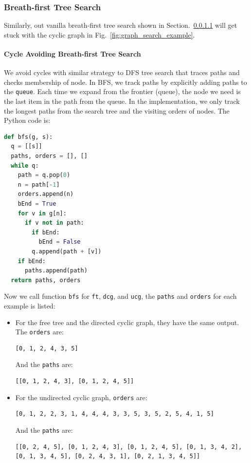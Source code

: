 \documentclass[../main.tex]{subfiles}
\begin{document}
\subsubsection{Breath-first Tree Search}
Similarly, out vanilla breath-first tree search shown in Section.~\ref{} will get stuck with the cyclic graph in Fig.~\ref{fig:graph_search_example}. 
\paragraph{Cycle Avoiding Breath-first Tree Search} We avoid cycles with similar strategy to DFS tree search that traces paths and checks membership of node. In BFS, we track paths by explicitly adding paths to the \texttt{queue}. Each time we expand from the frontier (queue), the node we need is the last item in the path from the queue. In the implementation, we only track the longest paths from the search tree and the visiting orders of nodes. The Python code is:
\begin{lstlisting}[language=Python]
def bfs(g, s):
  q = [[s]]
  paths, orders = [], []
  while q:
    path = q.pop(0)
    n = path[-1]
    orders.append(n)
    bEnd = True
    for v in g[n]:
      if v not in path:
        if bEnd:
          bEnd = False
        q.append(path + [v])
    if bEnd:
      paths.append(path)
  return paths, orders
\end{lstlisting}
Now we call function \texttt{bfs} for \texttt{ft}, \texttt{dcg}, and \texttt{ucg}, the \texttt{paths} and \texttt{orders} for each example is listed:
\begin{itemize}
    \item For the free tree and the directed cyclic graph, they have the same output. The \texttt{orders} are:
\begin{lstlisting}[numbers=none]
[0, 1, 2, 4, 3, 5]
\end{lstlisting}
    And the \texttt{paths} are:
\begin{lstlisting}[numbers=none]
[[0, 1, 2, 4, 3], [0, 1, 2, 4, 5]]
\end{lstlisting}
    \item For the undirected cyclic graph, \texttt{orders} are:
\begin{lstlisting}[numbers=none]
[0, 1, 2, 2, 3, 1, 4, 4, 4, 3, 3, 5, 3, 5, 2, 5, 4, 1, 5]
\end{lstlisting}
    And the \texttt{paths} are:
\begin{lstlisting}[numbers=none]
[[0, 2, 4, 5], [0, 1, 2, 4, 3], [0, 1, 2, 4, 5], [0, 1, 3, 4, 2], [0, 1, 3, 4, 5], [0, 2, 4, 3, 1], [0, 2, 1, 3, 4, 5]]
\end{lstlisting}
\end{itemize}
\end{document}
